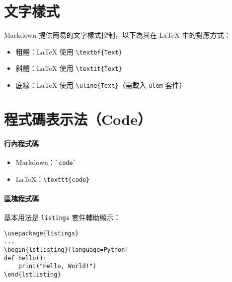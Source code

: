 \section{文字樣式}

Markdown 提供簡易的文字樣式控制，以下為其在 LaTeX 中的對應方式：

\begin{itemize}
  \item 粗體：LaTeX 使用 \verb|\textbf{Text}|
  \item 斜體：LaTeX 使用 \verb|\textit{Text}|
  \item 底線：LaTeX 使用 \verb|\uline{Text}|（需載入 \verb|ulem| 套件）
\end{itemize}

\section{程式碼表示法（Code）}

\paragraph{行內程式碼}
\begin{itemize}
  \item Markdown：\verb|`code`|
  \item LaTeX：\verb|\texttt{code}|
\end{itemize}

\paragraph{區塊程式碼}
基本用法是 \verb|listings| 套件輔助顯示：

\begin{verbatim}
\usepackage{listings}
...
\begin{lstlisting}[language=Python]
def hello():
    print("Hello, World!")
\end{lstlisting}
\end{verbatim}


